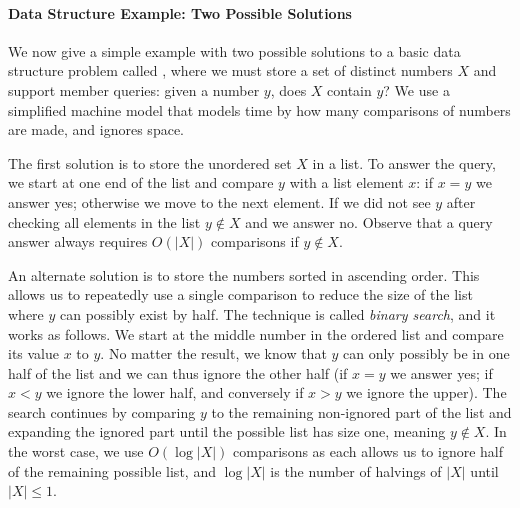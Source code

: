 \begin{leftbar}
    \vspace{-1.4em} \paragraph{Data Structure Example: Two Possible Solutions}
    We now give a simple example with two possible solutions to a basic data structure problem called , where we must
    store a set of distinct numbers $X$ and support member queries: given a number $y$, does $X$ contain $y$? We use a simplified machine model that models time by how many comparisons of numbers are made, and ignores space.
    
    The first solution is to store the unordered set $X$ in a list. To answer the query, we start at one end of the list and compare $y$ with a list element $x$: if $x = y$ we answer yes; otherwise we move to the next element. If we did not see $y$ after checking all elements in the list $y \not\in X$ and we answer no. Observe that a query answer always requires $O(|X|)$ comparisons if $y \not\in X$.
 
    An alternate solution is to store the numbers sorted in ascending order.
    This allows us to repeatedly use a single comparison to reduce the size of the list where $y$ can possibly exist by half. The technique is called \emph{binary search}, and  %
    it works as follows. We start at the middle number in the ordered list and compare its value $x$ to $y$. No matter the result, we know that $y$ can only possibly be in one half of the list and we can thus ignore the other half (if $x = y$ we answer yes; if $x < y$ we ignore the lower half, and conversely if $x > y$ we ignore the upper). The search continues by comparing $y$ to the remaining non-ignored part of the list and expanding the ignored part until the possible list has size one, meaning $y \not\in X$. In the worst case, we use $O(\log |X|)$ comparisons as each allows us to ignore half of the remaining possible list, and $\log |X|$ is the number of halvings of $|X|$ until $|X| \leq 1$.
    

\end{leftbar}
